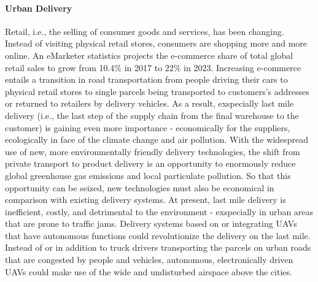 \paragraph{Urban Delivery}




Retail, i.e., the selling of consumer goods and services, has been changing. 
Instead of visiting physical retail stores, consumers are shopping more and more online.
An eMarketer \cite{eMarketer2019} statistics projects the e-commerce share of total global retail sales 
to grow from 10.4\% in 2017 to 22\% in 2023.
Increasing e-commerce entails a transition in road transportation from people driving their cars to physical retail stores
to single parcels being transported to customers's addresses or returned to retailers by delivery vehicles. \cite{Weideli2013}
As a result, exspecially last mile delivery (i.e., the last step of the supply chain from the final warehouse to the customer) 
is gaining even more importance
- economically for the suppliers, ecologically in face of the climate change and air pollution.
With the widespread use of new, more environmentally friendly delivery technologies, 
the shift from private transport to product delivery is an opportunity 
to enormously reduce global greenhouse gas emissions and local particulate pollution.
So that this opportunity can be seized, new technologies must also be economical in comparison with existing delivery systems.
At present, last mile delivery is inefficient, costly, and detrimental to the environment 
- exspecially in urban areas that are prone to traffic jams.
Delivery systems based on or integrating UAVs that have autonomous functions could revolutionize the delivery on the last mile.
Instead of or in addition to truck drivers transporting the parcels on urban roads that are congested by people and vehicles, 
autonomous, electronically driven UAVs could make use of the wide and undisturbed airspace above the cities.

